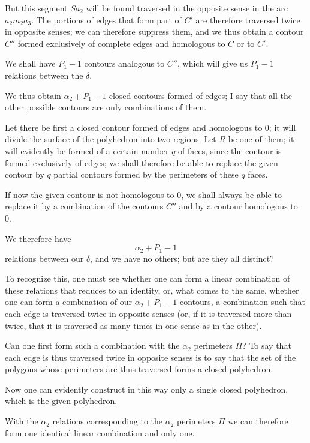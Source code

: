 \documentclass{article}
\begin{document}
But this segment $Sa_{2}$ will be found traversed in the opposite sense in the arc $a_{2}m_{2}a_{3}$. The portions of edges that form part of $C'$ are therefore traversed twice in opposite senses; we can therefore suppress them, and we thus obtain a contour $C''$ formed exclusively of complete edges and homologous to $C$ or to $C'$.

We shall have $P_{1} - 1$ contours analogous to $C''$, which will give us $P_{1} - 1$ relations between the $\delta$.

We thus obtain $\alpha_{2} + P_{1} - 1$ closed contours formed of edges; I say that all the other possible contours are only combinations of them.

Let there be first a closed contour formed of edges and homologous to 0; it
will divide the surface of the polyhedron into two regions. Let $R$ be one of them; it will evidently be formed of a certain number $q$ of faces, since the contour is formed exclusively of edges; we shall therefore be able to replace the given contour by $q$ partial contours formed by the perimeters of these $q$ faces.

If now the given contour is not homologous to 0, we shall always be able to replace it by a combination of the contours $C''$ and by a contour homologous to 0.

We therefore have
\[ \alpha_{2} + P_{1} - 1 \]
relations between our $\delta$, and we have no others; but are they all distinct?

To recognize this, one must see whether one can form a linear combination of these relations that reduces to an identity, or, what comes to the same, whether one can form a combination of our $\alpha_{2} + P_{1} - 1$ contours, a combination such that each edge is traversed twice in opposite senses (or, if it is traversed more than twice, that it is traversed as many times in one sense as in the other).

Can one first form such a combination with the $\alpha_{2}$ perimeters $\Pi$? To say that each edge is thus traversed twice in opposite senses is to say that the set of the polygons whose perimeters are thus traversed forms a closed polyhedron.

Now one can evidently construct in this way only a single closed polyhedron, which is the given polyhedron.

With the $\alpha_{2}$ relations corresponding to the $\alpha_{2}$ perimeters $\Pi$ we can therefore form one identical linear combination and only one.
\end{document}
